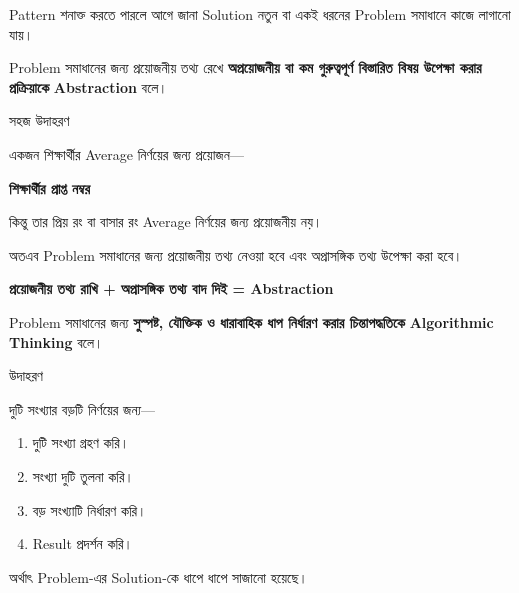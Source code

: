Pattern শনাক্ত করতে পারলে আগে জানা Solution নতুন বা একই ধরনের
Problem সমাধানে কাজে লাগানো যায়।


\begin{definitionbox}

Problem সমাধানের জন্য প্রয়োজনীয় তথ্য রেখে
\textbf{অপ্রয়োজনীয় বা কম গুরুত্বপূর্ণ বিস্তারিত বিষয় উপেক্ষা করার
প্রক্রিয়াকে} \textbf{Abstraction} বলে।

\end{definitionbox}

\begin{examplebox}{সহজ উদাহরণ}

একজন শিক্ষার্থীর Average নির্ণয়ের জন্য প্রয়োজন—

\begin{center}

\textbf{শিক্ষার্থীর প্রাপ্ত নম্বর}
\end{center}

কিন্তু তার প্রিয় রং বা বাসার রং Average নির্ণয়ের জন্য
প্রয়োজনীয় নয়।

অতএব Problem সমাধানের জন্য প্রয়োজনীয় তথ্য নেওয়া হবে এবং
অপ্রাসঙ্গিক তথ্য উপেক্ষা করা হবে।

\end{examplebox}

\begin{center}

\textbf{
প্রয়োজনীয় তথ্য রাখি
+
অপ্রাসঙ্গিক তথ্য বাদ দিই
=
Abstraction
}

\end{center}


\begin{definitionbox}

Problem সমাধানের জন্য
\textbf{সুস্পষ্ট, যৌক্তিক ও ধারাবাহিক ধাপ নির্ধারণ করার
চিন্তাপদ্ধতিকে}
\textbf{Algorithmic Thinking} বলে।

\end{definitionbox}

\begin{examplebox}{উদাহরণ}

দুটি সংখ্যার বড়টি নির্ণয়ের জন্য—

\begin{enumerate}

\item দুটি সংখ্যা গ্রহণ করি।
\item সংখ্যা দুটি তুলনা করি।
\item বড় সংখ্যাটি নির্ধারণ করি।
\item Result প্রদর্শন করি।

\end{enumerate}

অর্থাৎ Problem-এর Solution-কে ধাপে ধাপে সাজানো হয়েছে।

\end{examplebox}

